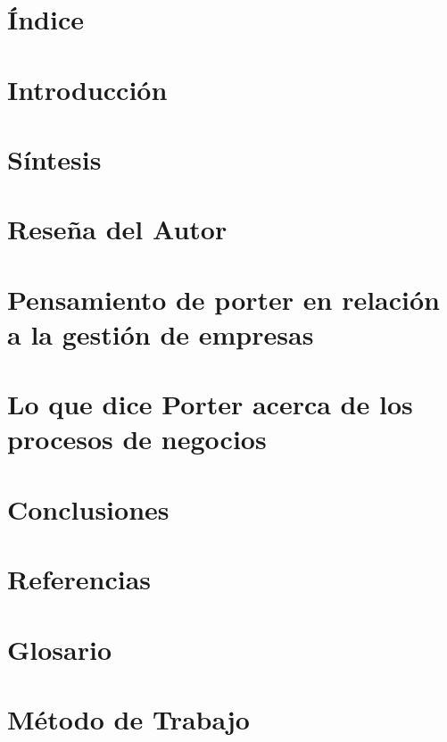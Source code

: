 \documentclass[11pt,letterpaper]{article}
\begin{document}


\section*{\'Indice}
\label{sec:indice}


\section*{Introducci\'on}
\label{sec:introduccion}


\section*{S\'intesis}
\label{sec:sintesis}



\section*{Rese\~na del Autor}
\label{sec:autor}


\section*{Pensamiento de porter en relación a la gestión de empresas}
\label{sec:pensamiento}


\section*{Lo que dice Porter acerca de los procesos de negocios}
\label{sec:procesos}



\section*{Conclusiones}
\label{sec:conclusiones}


\section*{Referencias}
\label{sec:referencias}


\section*{Glosario}
\label{sec:glosario}


\section*{M\'etodo de Trabajo}
\label{sec:metodo}

\end{document}
